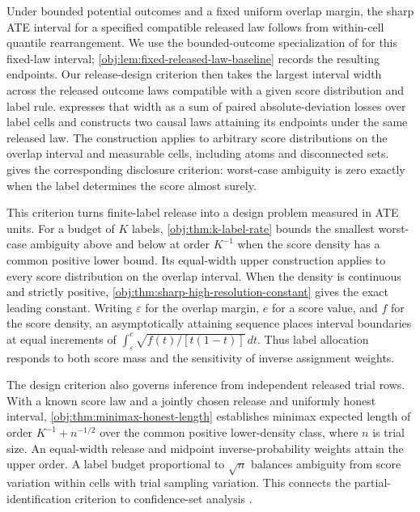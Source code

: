 Under bounded potential outcomes and a fixed uniform overlap margin, the sharp ATE interval for a specified compatible released law follows from within-cell quantile rearrangement. We use the bounded-outcome specialization of \citet[Theorem 3.2 and eq. (3.1)]{FanShermanShum2014} for this fixed-law interval; \cref{obj:lem:fixed-released-law-baseline} records the resulting endpoints. Our release-design criterion then takes the largest interval width across the released outcome laws compatible with a given score distribution and label rule.  expresses that width as a sum of paired absolute-deviation losses over label cells and constructs two causal laws attaining its endpoints under the same released law. The construction applies to arbitrary score distributions on the overlap interval and measurable cells, including atoms and disconnected sets.  gives the corresponding disclosure criterion: worst-case ambiguity is zero exactly when the label determines the score almost surely.

This criterion turns finite-label release into a design problem measured in ATE units. For a budget of \(K\) labels, \cref{obj:thm:k-label-rate} bounds the smallest worst-case ambiguity above and below at order \(K^{-1}\) when the score density has a common positive lower bound. Its equal-width upper construction applies to every score distribution on the overlap interval. When the density is continuous and strictly positive, \cref{obj:thm:sharp-high-resolution-constant} gives the exact leading constant. Writing \(\varepsilon\) for the overlap margin, \(e\) for a score value, and \(f\) for the score density, an asymptotically attaining sequence places interval boundaries at equal increments of \(\int_\varepsilon^e \sqrt{f(t)/[t(1-t)]}\,dt\). Thus label allocation responds to both score mass and the sensitivity of inverse assignment weights.

The design criterion also governs inference from independent released trial rows. With a known score law and a jointly chosen release and uniformly honest interval, \cref{obj:thm:minimax-honest-length} establishes minimax expected length of order \(K^{-1}+n^{-1/2}\) over the common positive lower-density class, where \(n\) is trial size. An equal-width release and midpoint inverse-probability weights attain the upper order. A label budget proportional to \(\sqrt n\) balances ambiguity from score variation within cells with trial sampling variation. This connects the partial-identification criterion to confidence-set analysis \citep{ImbensManski2004,Stoye2009,ChernozhukovHongTamer2007,KaidoMolinariStoye2019}.

